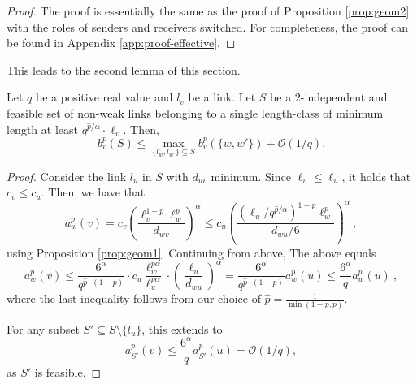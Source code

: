 \documentclass[11pt]{amsart}
\newcommand{\BO}{\mathcal{O}}
\begin{document}
\begin{proof}
The proof is essentially the same as the proof of Proposition \ref{prop:geom2} with the roles of senders and receivers switched. For completeness, the proof can be found in Appendix \ref{app:proof-effective}.
\end{proof}


This leads to the second lemma of this section.
\begin{lemma}
Let $q$ be a positive real value and $l_v$ be a link.
Let $S$ be a $2$-independent and feasible set of
non-weak links belonging to a single length-class of minimum length at least
$q^{\hat{p}/\alpha} \cdot \ell_v$.
Then, 
\[b^p_v(S) \le \max_{\{l_w,l_{w'}\} \subseteq S} b^p_v(\{w,w'\}) + \BO(1/q).\]
\label{lem:affequi}
\end{lemma}
\begin{proof}
Consider the link $l_u$ in $S$ with $d_{uv}$ minimum.
Since $\ell_v \le \ell_u$, it holds that $c_v \le c_u$.
Then, we have that
\[ a_w^p(v) = c_v \left(\frac{\ell_v^{1-p} \ell_w^p}{d_{wv}}\right)^\alpha
\le 
c_u \left(\frac{(\ell_u/q^{\hat{p}/\alpha})^{1-p} \ell_w^p}{d_{wu}/6}\right)^\alpha\ ,\]
using Proposition \ref{prop:geom1}. Continuing from above,
The above equals
\[ a_w^p(v) \le
 \frac{6^{\alpha}}{q^{\hat{p} \cdot (1-p)}} \cdot c_u\frac{\ell_w^{p\alpha}}{\ell_u^{p\alpha}}\cdot \left( \frac{\ell_u}{d_{wu}}\right)^\alpha
  =
 \frac{6^{\alpha}}{q^{\hat{p} \cdot (1-p)}} a_w^p(u)
 \le
  \frac{6^{\alpha}}{q} a_w^p(u)\ , \]
where the last inequality follows from our choice of $\hat{p}=\frac{1}{\min(1-p,p)}$.

For any subset $S'\subseteq S\setminus \{l_u\}$, this extends to 
\begin{equation}
a_{S'}^p(v)\leq \frac{6^{\alpha}}{q}  a_{S'}^p(u)=\BO(1/q),\label{bd:aff-bound1}
\end{equation}
as $S'$ is feasible.


\end{proof}
\end{document}
